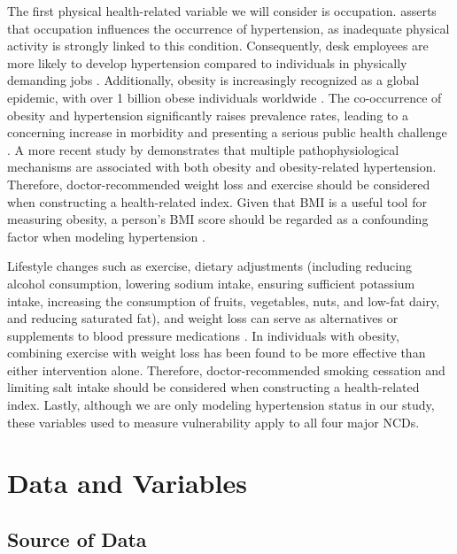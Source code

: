 \documentclass[
  12pt,
  a4paper]{article}
\begin{document}
The first physical health-related variable we will consider is occupation. \citet{grotto_hypertension_2008} asserts that occupation influences the occurrence of hypertension, as inadequate physical activity is strongly linked to this condition. Consequently, desk employees are more likely to develop hypertension compared to individuals in physically demanding jobs \citep{chomistek2012vigorous}. Additionally, obesity is increasingly recognized as a global epidemic, with over 1 billion obese individuals worldwide \citep{who_world_2022}. The co-occurrence of obesity and hypertension significantly raises prevalence rates, leading to a concerning increase in morbidity and presenting a serious public health challenge \citep{seravalle_obesity_2017}. A more recent study by \citet{seravalle2024obesity} demonstrates that multiple pathophysiological mechanisms are associated with both obesity and obesity-related hypertension. Therefore, doctor-recommended weight loss and exercise should be considered when constructing a health-related index. Given that BMI is a useful tool for measuring obesity, a person's BMI score should be regarded as a confounding factor when modeling hypertension \citep{jiang2016obesity}.

Lifestyle changes such as exercise, dietary adjustments (including reducing alcohol consumption, lowering sodium intake, ensuring sufficient potassium intake, increasing the consumption of fruits, vegetables, nuts, and low-fat dairy, and reducing saturated fat), and weight loss can serve as alternatives or supplements to blood pressure medications \citep{bacon_effects_2004}. In individuals with obesity, combining exercise with weight loss has been found to be more effective than either intervention alone. Therefore, doctor-recommended smoking cessation and limiting salt intake should be considered when constructing a health-related index. Lastly, although we are only modeling hypertension status in our study, these variables used to measure vulnerability apply to all four major NCDs.

\section{Data and Variables}\label{data-and-variables}

\subsection{Source of Data}\label{source-of-data}
\end{document}

